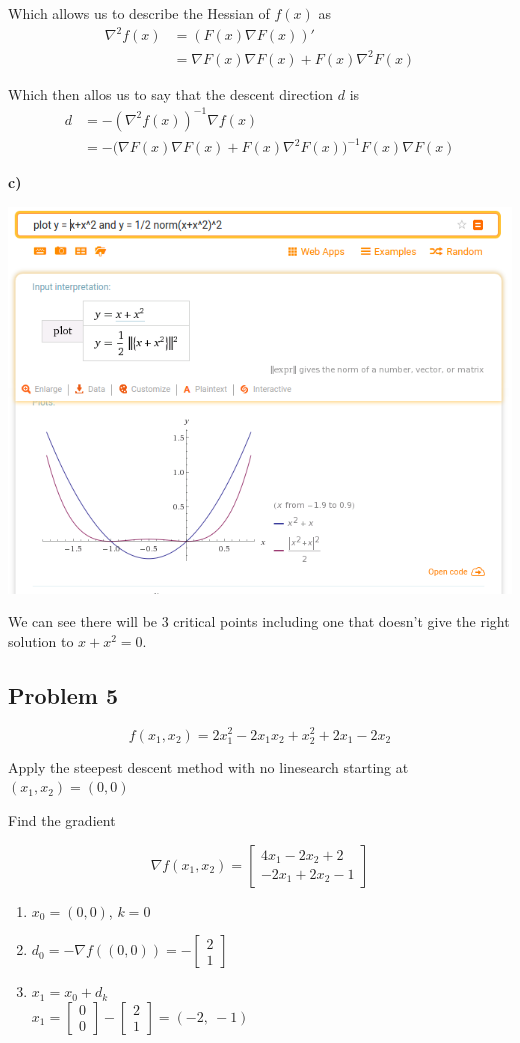 Which allows us to describe the Hessian of $f(x)$  as
\begin{align*}
\nabla^2 f(x) &= (F(x) \nabla F(x))' \\
&= \nabla F(x) \nabla F(x) + F(x) \nabla^2 F(x)
\end{align*}

Which then allos us to say that the descent direction $d$ is
\begin{align*}
	d &= - (\nabla^2 f(x))^{-1} \nabla f(x) \\
	  &= - \Bigg(\nabla F(x) \nabla F(x) + F(x) \nabla^2 F(x) \Bigg)^{-1} F(x) \nabla F(x)
\end{align*}


\textbf{c)}

\includegraphics[width=0.6\linewidth]{fig/unconstrained_exercices/pb4_c.png}

We can see there will be 3 critical points including one that doesn't give the right solution to $x+x^2 = 0$.

\subsection{Problem 5}

\[
f(x_1, x_2) = 2x_1^2 -2x_1x_2 + x_2^2 + 2x_1 -2x_2
\]

Apply the steepest descent method with no linesearch starting at $(x_1, x_2) = (0,0)$

\answer

Find the gradient

\[
	\nabla f(x_1, x_2) = 
	\begin{bmatrix}
		4x_1 - 2x_2 + 2 \\
		-2x_1 + 2x_2 - 1	
	\end{bmatrix}
\]

\begin{enumerate}
\item $x_0 = (0,0)$, $k = 0$
\item $d_0 = - \nabla f((0,0)) = - \begin{bmatrix}
2 \\
1
\end{bmatrix}$
\item $x_1 = x_0 + d_k$ \\
$x_1 = \begin{bmatrix}
0 \\ 0
\end{bmatrix} - \begin{bmatrix}
2 \\ 1
\end{bmatrix} = (-2,\ -1)$
\end{enumerate}

